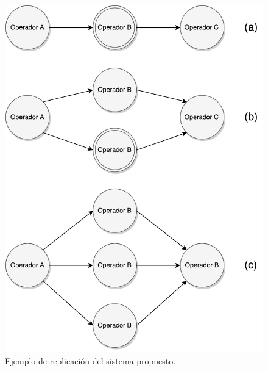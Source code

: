 \begin{figure}[!hb]
	\centering
		\includegraphics[scale=0.6]{images/EjReplicacion.pdf}
	\caption{Ejemplo de replicación del sistema propuesto.}
	\label{fig:ejReplicacion}
\end{figure}


